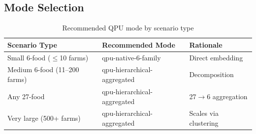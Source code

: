 \documentclass[11pt,a4paper]{article}
\begin{document}
\subsection{Mode Selection}

\begin{table}[H]
\centering
\caption{Recommended QPU mode by scenario type}
\begin{tabular}{lll}
\toprule
\textbf{Scenario Type} & \textbf{Recommended Mode} & \textbf{Rationale} \\
\midrule
Small 6-food ($\leq$10 farms) & qpu-native-6-family & Direct embedding \\
Medium 6-food (11--200 farms) & qpu-hierarchical-aggregated & Decomposition \\
Any 27-food & qpu-hierarchical-aggregated & 27$\to$6 aggregation \\
Very large (500+ farms) & qpu-hierarchical-aggregated & Scales via clustering \\
\bottomrule
\end{tabular}
\end{table}
\end{document}
